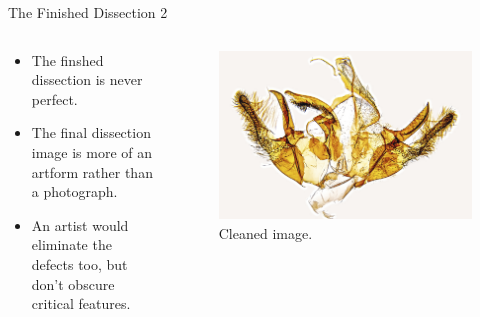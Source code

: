 \documentclass[
  ignorenonframetext,
]{beamer}
\providecommand{\tightlist}{%
  \setlength{\itemsep}{0pt}\setlength{\parskip}{0pt}}
\begin{document}
\begin{frame}{The Finished Dissection 2}
\protect\hypertarget{the-finished-dissection-2}{}
\begin{columns}[T]
\begin{column}{0.5\textwidth}
\begin{itemize}
\tightlist
\item
  The finshed dissection is never perfect.
\item
  The final dissection image is more of an artform rather than a
  photograph.
\item
  An artist would eliminate the defects too, but don't obscure critical
  features.
\end{itemize}
\end{column}

\begin{column}{0.5\textwidth}
\begin{figure}
\centering
\includegraphics{./images/PJP20220218-001-cleaned.jpg}
\caption{Cleaned image.}
\end{figure}
\end{column}
\end{columns}
\end{frame}
\end{document}
